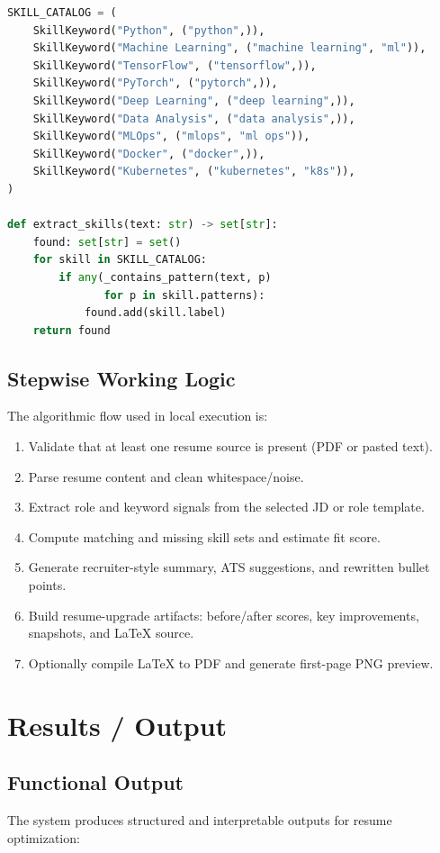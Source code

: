 \documentclass[conference]{IEEEtran}
\begin{document}
\begin{lstlisting}[language=Python, caption={Skill Extraction Example}]
SKILL_CATALOG = (
    SkillKeyword("Python", ("python",)),
    SkillKeyword("Machine Learning", ("machine learning", "ml")),
    SkillKeyword("TensorFlow", ("tensorflow",)),
    SkillKeyword("PyTorch", ("pytorch",)),
    SkillKeyword("Deep Learning", ("deep learning",)),
    SkillKeyword("Data Analysis", ("data analysis",)),
    SkillKeyword("MLOps", ("mlops", "ml ops")),
    SkillKeyword("Docker", ("docker",)),
    SkillKeyword("Kubernetes", ("kubernetes", "k8s")),
)

def extract_skills(text: str) -> set[str]:
    found: set[str] = set()
    for skill in SKILL_CATALOG:
        if any(_contains_pattern(text, p) 
               for p in skill.patterns):
            found.add(skill.label)
    return found
\end{lstlisting}

\subsection{Stepwise Working Logic}
The algorithmic flow used in local execution is:
\begin{enumerate}
    \item Validate that at least one resume source is present (PDF or pasted text).
    \item Parse resume content and clean whitespace/noise.
    \item Extract role and keyword signals from the selected JD or role template.
    \item Compute matching and missing skill sets and estimate fit score.
    \item Generate recruiter-style summary, ATS suggestions, and rewritten bullet points.
    \item Build resume-upgrade artifacts: before/after scores, key improvements, snapshots, and LaTeX source.
    \item Optionally compile LaTeX to PDF and generate first-page PNG preview.
\end{enumerate}

\section{Results / Output}

\subsection{Functional Output}
The system produces structured and interpretable outputs for resume optimization:
\end{document}
